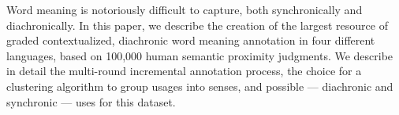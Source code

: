 Word meaning is notoriously difficult to capture, both synchronically and diachronically. In this paper, we describe the creation of the largest resource of graded contextualized, diachronic word meaning annotation in four different languages, based on 100,000 human semantic proximity judgments. We describe in detail the multi-round incremental annotation process, the choice for a clustering algorithm to group usages into senses, and possible --- diachronic and synchronic --- uses for this dataset.
